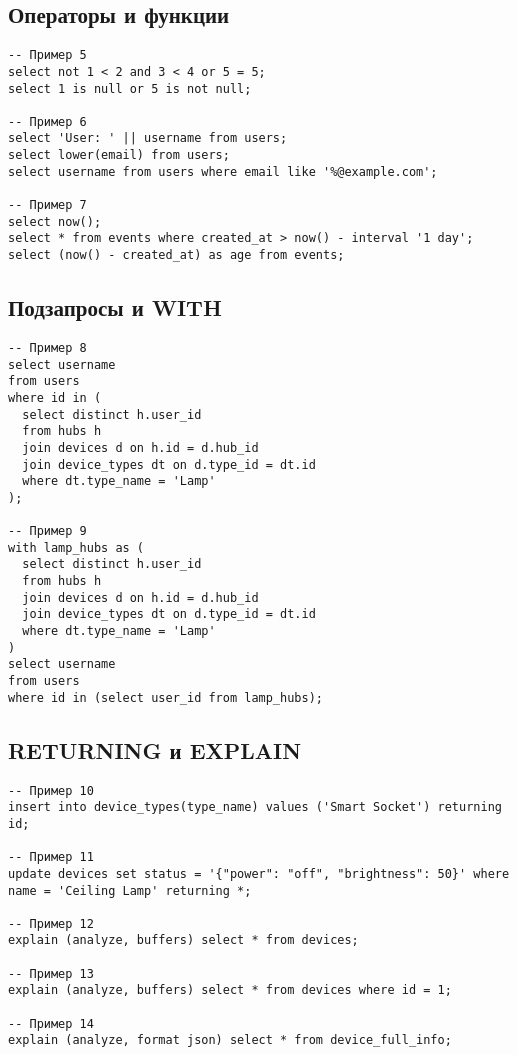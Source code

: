 \documentclass[oneside,a4paper,14pt]{extarticle}
\begin{document}
\subsection*{Операторы и функции}
\begin{verbatim}
-- Пример 5
select not 1 < 2 and 3 < 4 or 5 = 5;
select 1 is null or 5 is not null;

-- Пример 6
select 'User: ' || username from users;
select lower(email) from users;
select username from users where email like '%@example.com';

-- Пример 7
select now();
select * from events where created_at > now() - interval '1 day';
select (now() - created_at) as age from events;
\end{verbatim}

\subsection*{Подзапросы и WITH}
\begin{verbatim}
-- Пример 8
select username 
from users 
where id in (
  select distinct h.user_id 
  from hubs h 
  join devices d on h.id = d.hub_id
  join device_types dt on d.type_id = dt.id
  where dt.type_name = 'Lamp'
);

-- Пример 9
with lamp_hubs as (
  select distinct h.user_id 
  from hubs h 
  join devices d on h.id = d.hub_id
  join device_types dt on d.type_id = dt.id
  where dt.type_name = 'Lamp'
)
select username 
from users 
where id in (select user_id from lamp_hubs);
\end{verbatim}

\subsection*{RETURNING и EXPLAIN}
\begin{verbatim}
-- Пример 10
insert into device_types(type_name) values ('Smart Socket') returning id;

-- Пример 11
update devices set status = '{"power": "off", "brightness": 50}' where name = 'Ceiling Lamp' returning *;

-- Пример 12
explain (analyze, buffers) select * from devices;

-- Пример 13
explain (analyze, buffers) select * from devices where id = 1;

-- Пример 14
explain (analyze, format json) select * from device_full_info;
\end{verbatim}
\end{document}
